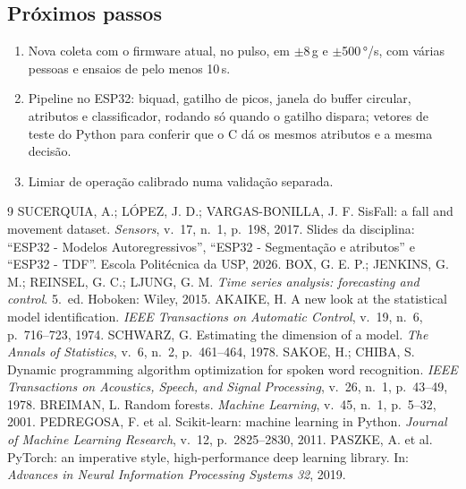 \documentclass[12pt,a4paper]{article}
\begin{document}
\subsection{Próximos passos}
\begin{enumerate}[leftmargin=1.8em]
\item Nova coleta com o firmware atual, no pulso, em $\pm$8\,g e $\pm$500\,°/s, com
  várias pessoas e ensaios de pelo menos 10\,s.
\item Pipeline no ESP32: biquad, gatilho de picos, janela do buffer circular,
  atributos e classificador, rodando só quando o gatilho dispara; vetores de teste do
  Python para conferir que o C dá os mesmos atributos e a mesma decisão.
\item Limiar de operação calibrado numa validação separada.
\end{enumerate}

{}
\begin{thebibliography}{9}
 SUCERQUIA, A.; LÓPEZ, J. D.; VARGAS-BONILLA, J. F. SisFall: a fall
  and movement dataset. \emph{Sensors}, v.~17, n.~1, p.~198, 2017.
 Slides da disciplina: ``ESP32 - Modelos Autoregressivos'', ``ESP32 -
  Segmentação e atributos'' e ``ESP32 - TDF''. Escola Politécnica da USP, 2026.
 BOX, G. E. P.; JENKINS, G. M.; REINSEL, G. C.; LJUNG, G. M. \emph{Time
  series analysis: forecasting and control}. 5.~ed. Hoboken: Wiley, 2015.
 AKAIKE, H. A new look at the statistical model identification.
  \emph{IEEE Transactions on Automatic Control}, v.~19, n.~6, p.~716--723, 1974.
 SCHWARZ, G. Estimating the dimension of a model. \emph{The Annals of
  Statistics}, v.~6, n.~2, p.~461--464, 1978.
 SAKOE, H.; CHIBA, S. Dynamic programming algorithm optimization for
  spoken word recognition. \emph{IEEE Transactions on Acoustics, Speech, and Signal
  Processing}, v.~26, n.~1, p.~43--49, 1978.
 BREIMAN, L. Random forests. \emph{Machine Learning}, v.~45, n.~1,
  p.~5--32, 2001.
 PEDREGOSA, F. et al. Scikit-learn: machine learning in Python.
  \emph{Journal of Machine Learning Research}, v.~12, p.~2825--2830, 2011.
 PASZKE, A. et al. PyTorch: an imperative style, high-performance deep
  learning library. In: \emph{Advances in Neural Information Processing Systems 32}, 2019.
\end{thebibliography}
\end{document}
